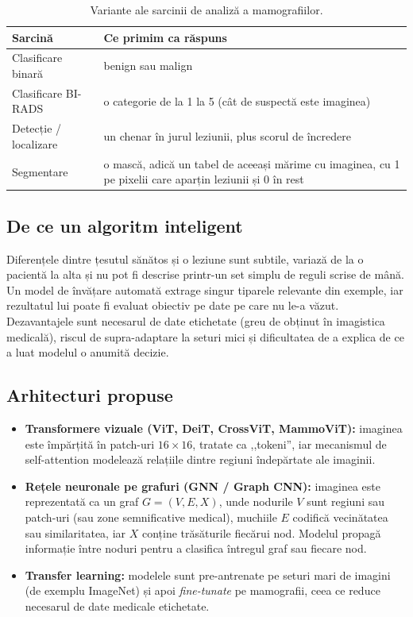 \documentclass[runningheads,a4paper,11pt]{report}
\begin{document}
\begin{table}[htbp]
	\caption{Variante ale sarcinii de analiză a mamografiilor.}
	\label{tab:tasks}
	\begin{center}
		\begin{tabular}{p{4cm}p{11cm}}
			\textbf{Sarcină} & \textbf{Ce primim ca răspuns} \\
			\hline\hline
			Clasificare binară & benign sau malign \\
			Clasificare BI-RADS & o categorie de la 1 la 5 (cât de suspectă este imaginea) \\
			Detecție / localizare & un chenar în jurul leziunii, plus scorul de încredere \\
			Segmentare & o mască, adică un tabel de aceeași mărime cu imaginea, cu 1 pe pixelii care aparțin leziunii și 0 în rest \\
		\end{tabular}
	\end{center}
\end{table}

\subsection{De ce un algoritm inteligent}

Diferențele dintre țesutul sănătos și o leziune sunt subtile, variază de la o pacientă la alta și nu pot fi descrise printr-un set simplu de reguli scrise de mână. Un model de învățare automată extrage singur tiparele relevante din exemple, iar rezultatul lui poate fi evaluat obiectiv pe date pe care nu le-a văzut. Dezavantajele sunt necesarul de date etichetate (greu de obținut în imagistica medicală), riscul de supra-adaptare la seturi mici și dificultatea de a explica de ce a luat modelul o anumită decizie.

\subsection{Arhitecturi propuse}

\begin{itemize}
	\item \textbf{Transformere vizuale (ViT, DeiT, CrossViT, MammoViT):} imaginea este împărțită în patch-uri $16 \times 16$, tratate ca ,,tokeni'', iar mecanismul de self-attention modelează relațiile dintre regiuni îndepărtate ale imaginii.
	\item \textbf{Rețele neuronale pe grafuri (GNN / Graph CNN):} imaginea este reprezentată ca un graf $G = (V, E, X)$, unde nodurile $V$ sunt regiuni sau patch-uri (sau zone semnificative medical), muchiile $E$ codifică vecinătatea sau similaritatea, iar $X$ conține trăsăturile fiecărui nod. Modelul propagă informație între noduri pentru a clasifica întregul graf sau fiecare nod.
	\item \textbf{Transfer learning:} modelele sunt pre-antrenate pe seturi mari de imagini (de exemplu ImageNet) și apoi \emph{fine-tunate} pe mamografii, ceea ce reduce necesarul de date medicale etichetate.
\end{itemize}
\end{document}
